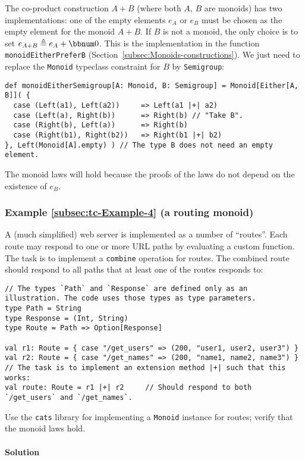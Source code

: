 The co-product construction  $A+B$ (where both $A$, $B$ are monoids)
has two implementations: one of the empty elements $e_{A}$ or $e_{B}$
must be chosen as the empty element for the monoid $A+B$. If $B$
is not a monoid, the only choice is to set $e_{A+B}\triangleq e_{A}+\bbnum 0$.
This is the implementation in the function \lstinline!monoidEitherPreferB!
(Section~\ref{subsec:Monoids-constructions}). We just need to replace
the \lstinline!Monoid! typeclass constraint for $B$ by \lstinline!Semigroup!:
\begin{lstlisting}
def monoidEitherSemigroup[A: Monoid, B: Semigroup] = Monoid[Either[A, B]]( {
  case (Left(a1), Left(a2))     => Left(a1 |+| a2)
  case (Left(a), Right(b))      => Right(b) // "Take B".
  case (Right(b), Left(a))      => Right(b)
  case (Right(b1), Right(b2))   => Right(b1 |+| b2)
}, Left(Monoid[A].empty) ) // The type B does not need an empty element.
\end{lstlisting}
The monoid laws will hold because the proofs of the laws do not depend
on the existence of $e_{B}$.

\subsubsection{Example \label{subsec:tc-Example-4}\ref{subsec:tc-Example-4} (a
routing monoid)}

A (much simplified) web server is implemented as a number of \textsf{``}routes\textsf{''}.
Each route may respond to one or more URL paths by evaluating a custom
function. The task is to implement a \lstinline!combine! operation
for routes. The combined route should respond to all paths that at
least one of the  routes responds to:
\begin{lstlisting}
// The types `Path` and `Response` are defined only as an illustration. The code uses those types as type parameters.
type Path = String
type Response = (Int, String)
type Route = Path => Option[Response]

val r1: Route = { case "/get_users" => (200, "user1, user2, user3") }
val r2: Route = { case "/get_names" => (200, "name1, name2, name3") }
// The task is to implement an extension method |+| such that this works:
val route: Route = r1 |+| r2     // Should respond to both `/get_users` and `/get_names`.
\end{lstlisting}
Use the \texttt{cats} library for implementing a \lstinline!Monoid!
instance for routes; verify that the monoid laws hold.

\paragraph{Solution}

